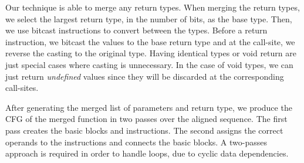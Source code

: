 
Our technique is able to merge any return types.
When merging the return types, we select the largest return type, in the number
of bits, as the base type.
Then, we use bitcast instructions to convert between the types.
Before a return instruction, we bitcast the values to the base return type and
at the call-site, we reverse the casting to the original type.
Having identical types or void return are just special cases where casting is
unnecessary.
In the case of void types, we can just return \textit{undefined} values since they
will be discarded at the corresponding call-sites.

After generating the merged list of parameters and return type, we produce the
CFG of the merged function in two passes over the aligned sequence.
The first pass creates the basic blocks and instructions.
The second assigns the correct operands to the instructions and connects the basic blocks.
A two-passes approach is required in order to handle loops, due to cyclic data dependencies.

